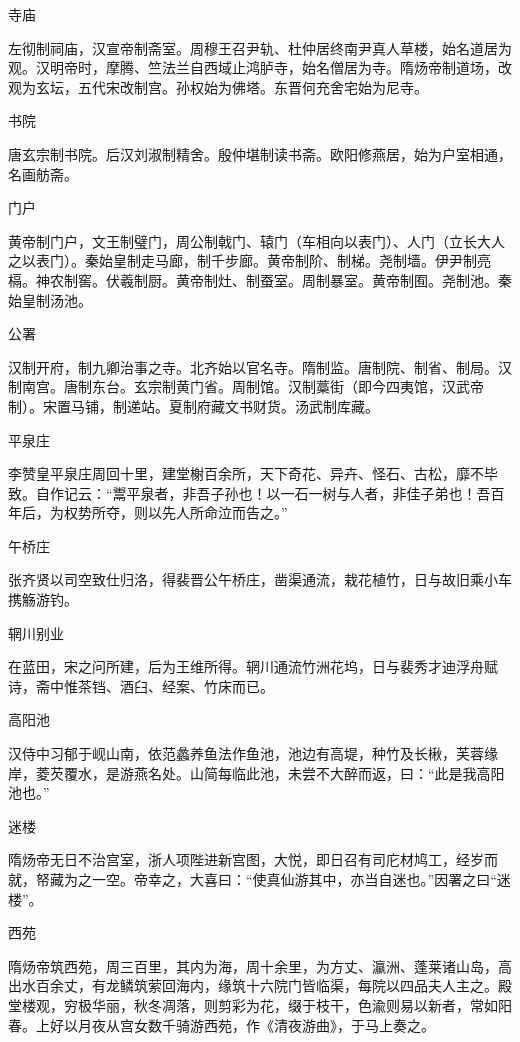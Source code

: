\documentclass[a4paper,12pt,UTF8,twoside]{ctexbook}
\begin{document}
    寺庙
    
    左彻制祠庙，汉宣帝制斋室。周穆王召尹轨、杜仲居终南尹真人草楼，始名道居为观。汉明帝时，摩腾、竺法兰自西域止鸿胪寺，始名僧居为寺。隋炀帝制道场，改观为玄坛，五代宋改制宫。孙权始为佛塔。东晋何充舍宅始为尼寺。
    
    书院
    
    唐玄宗制书院。后汉刘淑制精舍。殷仲堪制读书斋。欧阳修燕居，始为户室相通，名画舫斋。
    
    门户
    
    黄帝制门户，文王制璧门，周公制戟门、辕门（车相向以表门）、人门（立长大人之以表门）。秦始皇制走马廊，制千步廊。黄帝制阶、制梯。尧制墙。伊尹制亮槅。神农制窖。伏羲制厨。黄帝制灶、制蚕室。周制暴室。黄帝制囿。尧制池。秦始皇制汤池。
    
    公署
    
    汉制开府，制九卿治事之寺。北齐始以官名寺。隋制监。唐制院、制省、制局。汉制南宫。唐制东台。玄宗制黄门省。周制馆。汉制藁街（即今四夷馆，汉武帝制）。宋置马铺，制递站。夏制府藏文书财货。汤武制库藏。
    
    平泉庄
    
    李赞皇平泉庄周回十里，建堂榭百余所，天下奇花、异卉、怪石、古松，靡不毕致。自作记云：“鬻平泉者，非吾子孙也！以一石一树与人者，非佳子弟也！吾百年后，为权势所夺，则以先人所命泣而告之。”
    
    午桥庄
    
    张齐贤以司空致仕归洛，得裴晋公午桥庄，凿渠通流，栽花植竹，日与故旧乘小车携觞游钓。
    
    辋川别业
    
    在蓝田，宋之问所建，后为王维所得。辋川通流竹洲花坞，日与裴秀才迪浮舟赋诗，斋中惟茶铛、酒臼、经案、竹床而已。
    
    高阳池
    
    汉侍中习郁于岘山南，依范蠡养鱼法作鱼池，池边有高堤，种竹及长楸，芙蓉缘岸，菱芡覆水，是游燕名处。山简每临此池，未尝不大醉而返，曰：“此是我高阳池也。”
    
    迷楼
    
    隋炀帝无日不治宫室，浙人项陛进新宫图，大悦，即日召有司庀材鸠工，经岁而就，帑藏为之一空。帝幸之，大喜曰：“使真仙游其中，亦当自迷也。”因署之曰“迷楼”。
    
    西苑
    
    隋炀帝筑西苑，周三百里，其内为海，周十余里，为方丈、瀛洲、蓬莱诸山岛，高出水百余丈，有龙鳞筑萦回海内，缘筑十六院门皆临渠，每院以四品夫人主之。殿堂楼观，穷极华丽，秋冬凋落，则剪彩为花，缀于枝干，色渝则易以新者，常如阳春。上好以月夜从宫女数千骑游西苑，作《清夜游曲》，于马上奏之。
    
\end{document}
